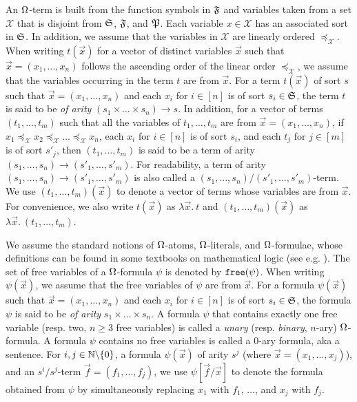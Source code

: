 An $\Omega$-term is built from the function symbols in ${\mathfrak{F}}$ and variables taken from a set $\mathcal{X}$ that is disjoint from ${\mathfrak{S}}$, ${\mathfrak{F}}$, and ${\mathfrak{P}}$. Each variable $x \in \mathcal{X}$ has an associated sort in ${\mathfrak{S}}$. In addition, we assume that the variables in $\mathcal{X}$ are linearly ordered $\preceq_{\mathcal{X}}$. When writing $t(\vec{x})$ for a vector of distinct variables $\vec{x}$ such that $\vec{x} = (x_1,\dots, x_n)$ follows the ascending order of the linear order $\preceq_{\mathcal{X}}$, we assume that the variables occurring in the term $t$ are from $\vec{x}$. For a term $t(\vec{x})$ of sort $s$ such that $\vec{x} = (x_1, \dots, x_n)$ and each $x_i$ for $i \in [n]$ is of sort $s_i \in {\mathfrak{S}}$, the term $t$ is said to be \emph{of arity} $(s_1 \times \dots \times s_n) \rightarrow s$. In addition, for a vector of terms $(t_1, \dots, t_m)$ such that all the variables of $t_1 ,\dots, t_m$ are from $\vec{x} = (x_1, \dots, x_n)$, if $x_1 \preceq_{\mathcal{X}} x_2  \preceq_{\mathcal{X}} \dots  \preceq_{\mathcal{X}} x_n$, each $x_i$ for $i \in [n]$ is of sort $s_i$, and each $t_j$ for $j \in [m]$ is of sort $s'_j$, then $(t_1,\dots, t_m)$ is said to be a term of arity $(s_1,\dots, s_n) \rightarrow (s'_1,\dots, s'_m)$. For readability, a term of arity $(s_1,\dots, s_n) \rightarrow (s'_1,\dots, s'_m)$ is also called a $(s_1,\dots, s_n) \big/ (s'_1,\dots, s'_m)$-term. We use $(t_1,\dots, t_m)(\vec{x})$ to denote a vector of terms whose variables are from $\vec{x}$.  For convenience, we also write $t(\vec{x})$ as $\lambda \vec{x}.\ t$ and $(t_1,\dots, t_m)(\vec{x})$ as $\lambda \vec{x}.\ (t_1,\dots, t_m)$. 

We assume the standard notions of $\Omega$-atoms, $\Omega$-literals, and $\Omega$-formulae, whose definitions can be found in some textbooks on mathematical logic (see e.g. \cite{Gal85}). The set of free variables of a $\Omega$-formula $\psi$ is denoted by $\mathtt{free} (\psi)$. When writing $\psi(\vec{x})$, we assume that the free variables of $\psi$ are from $\vec{x}$. For a formula  $\psi(\vec{x})$ such that $\vec{x} = (x_1, \dots, x_n)$ and each $x_i$ for $i \in [n]$ is of sort $s_i \in {\mathfrak{S}}$, the formula $\psi$ is said to be \emph{of arity} $s_1 \times \dots \times s_n$.
A formula $\psi$ that contains exactly one free variable (resp. two, $n \ge 3$ free variables) is called a \emph{unary} (resp. \emph{binary}, $n$-ary) $\Omega$-formula. A formula $\psi$ contains no free variables is called a $0$-ary formula, aka a sentence. For $i, j \in \mathbb{N} \backslash \{0\}$, a formula $\psi(\vec{x})$ of arity $s^j$ (where $\vec{x}=(x_1, \dots, x_j)$), and an $s^i/s^j$-term $\vec{f}=(f_1,\dots, f_j)$, we use $\psi[\vec{f}/\vec{x}]$ to denote the formula obtained from $\psi$ by simultaneously replacing $x_1$ with $f_1$, $\dots$, and $x_j$ with $f_j$.

